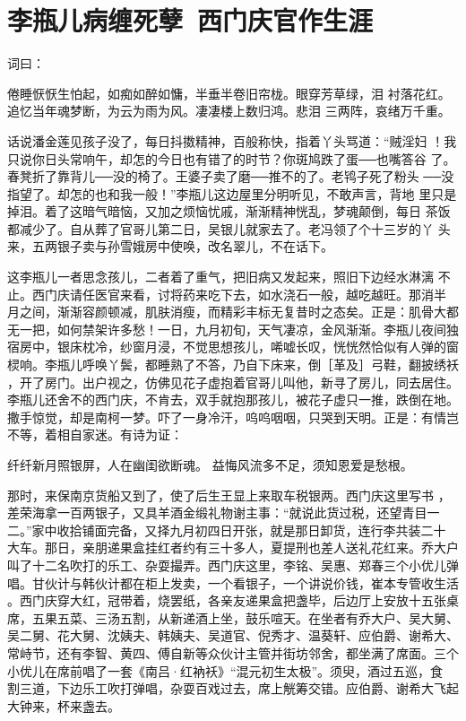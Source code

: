\chapter{李瓶儿病缠死孽~西门庆官作生涯}

词曰：

倦睡恹恹生怕起，如痴如醉如慵，半垂半卷旧帘栊。眼穿芳草绿，泪
衬落花红。  追忆当年魂梦断，为云为雨为风。凄凄楼上数归鸿。悲泪
三两阵，哀绪万千重。

话说潘金莲见孩子没了，每日抖擞精神，百般称快，指着丫头骂道：“贼淫妇
！我只说你日头常响午，却怎的今日也有错了的时节？你斑鸠跌了蛋──也嘴答谷
了。春凳折了靠背儿──没的椅了。王婆子卖了磨──推不的了。老鸨子死了粉头
──没指望了。却怎的也和我一般！”李瓶儿这边屋里分明听见，不敢声言，背地
里只是掉泪。着了这暗气暗恼，又加之烦恼忧戚，渐渐精神恍乱，梦魂颠倒，每日
茶饭都减少了。自从葬了官哥儿第二日，吴银儿就家去了。老冯领了个十三岁的丫
头来，五两银子卖与孙雪娥房中使唤，改名翠儿，不在话下。

这李瓶儿一者思念孩儿，二者着了重气，把旧病又发起来，照旧下边经水淋漓
不止。西门庆请任医官来看，讨将药来吃下去，如水浇石一般，越吃越旺。那消半
月之间，渐渐容颜顿减，肌肤消瘦，而精彩丰标无复昔时之态矣。正是：肌骨大都
无一把，如何禁架许多愁！一日，九月初旬，天气凄凉，金风渐渐。李瓶儿夜间独
宿房中，银床枕冷，纱窗月浸，不觉思想孩儿，唏嘘长叹，恍恍然恰似有人弹的窗
棂响。李瓶儿呼唤丫鬓，都睡熟了不答，乃自下床来，倒［革及］弓鞋，翻披绣袄
，开了房门。出户视之，仿佛见花子虚抱着官哥儿叫他，新寻了房儿，同去居住。
李瓶儿还舍不的西门庆，不肯去，双手就抱那孩儿，被花子虚只一推，跌倒在地。
撒手惊觉，却是南柯一梦。吓了一身冷汗，呜呜咽咽，只哭到天明。正是：有情岂
不等，着相自家迷。有诗为证：

纤纤新月照银屏，人在幽闺欲断魂。
益悔风流多不足，须知恩爱是愁根。

那时，来保南京货船又到了，使了后生王显上来取车税银两。西门庆这里写书
，差荣海拿一百两银子，又具羊酒金缎礼物谢主事：“就说此货过税，还望青目一
二。”家中收拾铺面完备，又择九月初四日开张，就是那日卸货，连行李共装二十
大车。那日，亲朋递果盒挂红者约有三十多人，夏提刑也差人送礼花红来。乔大户
叫了十二名吹打的乐工、杂耍撮弄。西门庆这里，李铭、吴惠、郑春三个小优儿弹
唱。甘伙计与韩伙计都在柜上发卖，一个看银子，一个讲说价钱，崔本专管收生活
。西门庆穿大红，冠带着，烧罢纸，各亲友递果盒把盏毕，后边厅上安放十五张桌
席，五果五菜、三汤五割，从新递酒上坐，鼓乐喧天。在坐者有乔大户、吴大舅、
吴二舅、花大舅、沈姨夫、韩姨夫、吴道官、倪秀才、温葵轩、应伯爵、谢希大、
常峙节，还有李智、黄四、傅自新等众伙计主管并街坊邻舍，都坐满了席面。三个
小优儿在席前唱了一套《南吕·红衲袄》“混元初生太极”。须臾，酒过五巡，食
割三道，下边乐工吹打弹唱，杂耍百戏过去，席上觥筹交错。应伯爵、谢希大飞起
大钟来，杯来盏去。


